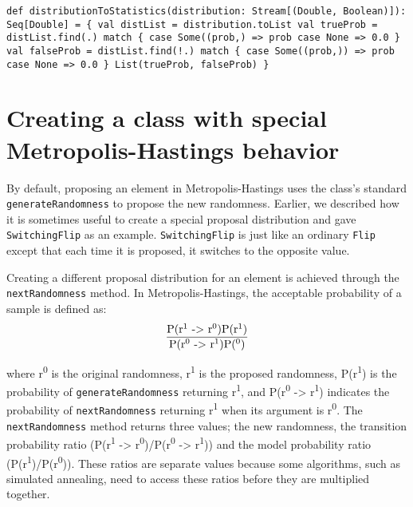 \begin{flushleft}
\texttt{def distributionToStatistics(distribution: Stream[(Double, Boolean)]): Seq[Double] = \{
\newline \tab val distList = distribution.toList
\newline \tab val trueProb = 
\newline \tab \tab distList.find(\textunderscore.) match \{
\newline \tab \tab \tab case Some((prob,\textunderscore) => prob
\newline \tab \tab \tab case None => 0.0
\newline \tab \tab \}
\newline \tab val falseProb = 
\newline \tab \tab distList.find(!\textunderscore.) match \{
\newline \tab \tab \tab case Some((prob,\textunderscore)) => prob
\newline \tab \tab \tab case None => 0.0
\newline \tab \tab \} 
\newline \tab List(trueProb, falseProb)
\newline \}
}
\end{flushleft}

\section{Creating a class with special Metropolis-Hastings behavior}

By default, proposing an element in Metropolis-Hastings uses the class's standard \texttt{generateRandomness} to propose the new randomness. Earlier, we described how it is sometimes useful to create a special proposal distribution and gave \texttt{SwitchingFlip} as an example. \texttt{SwitchingFlip} is just like an ordinary \texttt{Flip} except that each time it is proposed, it switches to the opposite value.

Creating a different proposal distribution for an element is achieved through the \texttt{nextRandomness} method. In Metropolis-Hastings, the acceptable probability of a sample is defined as:
\[\frac{\text{P(r\textsuperscript{1} -> r\textsuperscript{0})P(r\textsuperscript{1})}}{\text{P(r\textsuperscript{0} -> r\textsuperscript{1})P(\textsuperscript{0})}}\]

where r\textsuperscript{0} is the original randomness, r\textsuperscript{1} is the proposed randomness, P(r\textsuperscript{1}) is the probability of \texttt{generateRandomness} returning r\textsuperscript{1}, and P(r\textsuperscript{0} -> r\textsuperscript{1}) indicates the probability of \texttt{nextRandomness} returning r\textsuperscript{1} when its argument is r\textsuperscript{0}. The \texttt{nextRandomness} method returns three values; the new randomness, the transition probability ratio (P(r\textsuperscript{1} -> r\textsuperscript{0})/P(r\textsuperscript{0} -> r\textsuperscript{1})) and the model probability ratio (P(r\textsuperscript{1})/P(r\textsuperscript{0})). These ratios are separate values because some algorithms, such as simulated annealing, need to access these ratios before they are multiplied together.

